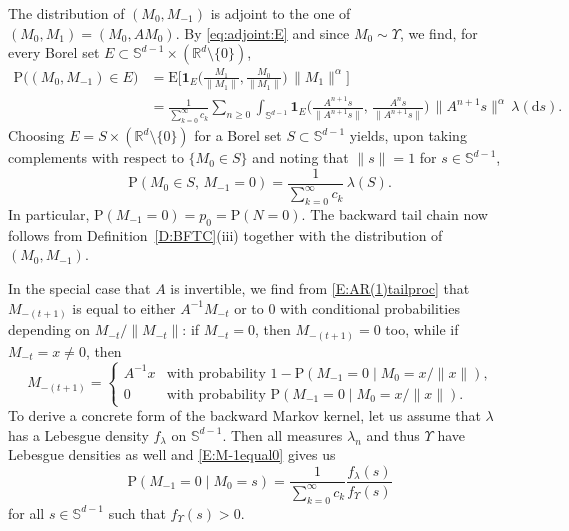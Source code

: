 \documentclass{aptpubarxiv}
\numberwithin{equation}{section}
\begin{document}
\begin{ex}
The distribution of $(M_0, M_{-1})$ is adjoint to the one of $(M_0, M_1) = (M_0, AM_0)$. By \eqref{eq:adjoint:E} and since $M_0 \sim \Upsilon$, we find, for every Borel set $E \subset \mathbb{S}^{d-1} \times (\mathbb{R}^d \setminus \{ 0 \})$,
\begin{align*}
  {\mathrm{P}}\bigl( (M_0, M_{-1}) \in E \bigr)
  &= {\mathrm{E}} 
  \biggl[ 
    {\boldsymbol{1}}_E \biggl( \frac{M_1}{\|M_1\|}, \frac{M_0}{\|M_1\|} \biggr) \, \|M_1\|^\alpha 
  \biggr] \\
  &= \frac{1}{\sum_{k = 0}^\infty c_k}
  \sum_{n \ge 0} 
  \int_{\mathbb{S}^{d-1}}
    {\boldsymbol{1}}_E \biggl( \frac{A^{n+1}s}{\|A^{n+1}s\|}, \, \frac{A^n s}{\|A^{n+1} s\|} \biggr) \,
    \| A^{n+1} s \|^\alpha \,
  \lambda( \mathrm{d}s ).
\end{align*}
Choosing $E = S \times (\mathbb{R}^d \setminus \{ 0 \})$ for a Borel set $S \subset \mathbb{S}^{d-1}$ yields, upon taking complements with respect to $\{ M_0 \in S \}$ and noting that $\| s \| = 1$ for $s \in \mathbb{S}^{d-1}$,
\begin{equation}
\label{E:M-1equal0}
  {\mathrm{P}}( M_0 \in S, \, M_{-1} = 0 )
  = \frac{1}{\sum_{k = 0}^\infty c_k} \, \lambda(S).
\end{equation}
In particular, ${\mathrm{P}}(M_{-1} = 0) = p_0 = {\mathrm{P}}(N = 0)$. The backward tail chain now follows from Definition~\ref{D:BFTC}(iii) together with the distribution of $(M_0, M_{-1})$.

In the special case that $A$ is invertible, we find from \eqref{E:AR(1)tailproc} that $M_{-(t+1)}$ is equal to either $A^{-1} M_{-t}$ or to $0$ with conditional probabilities depending on $M_{-t}/\|M_{-t}\|$: if $M_{-t} = 0$, then $M_{-(t+1)} = 0$ too, while if $M_{-t} = x \ne 0$, then
\[
  M_{-(t+1)} =
  \begin{cases}
    A^{-1} x & \text{with probability $1 - {\mathrm{P}}(M_{-1} = 0 \mid M_0 = x / {\|{x}\|})$,} \\
    0 & \text{with probability ${\mathrm{P}}(M_{-1} = 0 \mid M_0 = x / {\|{x}\|})$.}
  \end{cases}
\]
To derive a concrete form of the backward Markov kernel, let us assume that $\lambda$ has a Lebesgue density $f_\lambda$ on $\mathbb{S}^{d-1}$. Then all measures $\lambda_n$ and thus $\Upsilon$ have Lebesgue densities as well and \eqref{E:M-1equal0} gives us
\[
  {\mathrm{P}}(M_{-1} = 0 \mid M_0 = s)
  = \frac{1}{\sum_{k = 0}^\infty c_k} \frac{f_\lambda(s)}{f_\Upsilon(s)}
\]
for all $s \in \mathbb{S}^{d-1}$ such that $f_\Upsilon(s) > 0$.


\end{ex}
\end{document}
